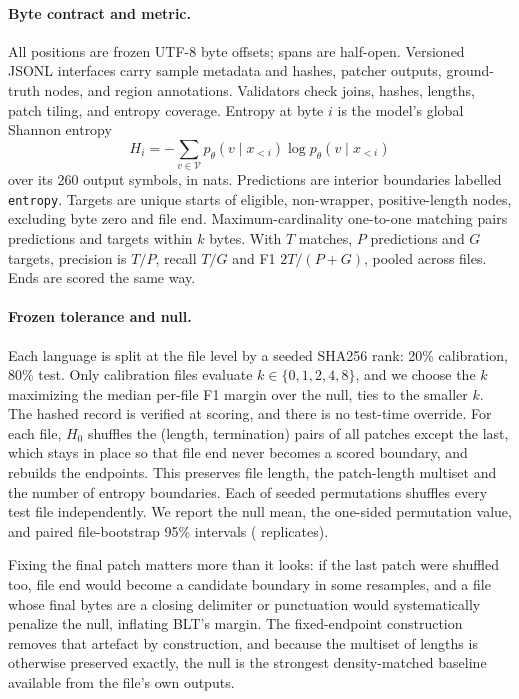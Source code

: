 \paragraph{Byte contract and metric.} All positions are frozen UTF-8 byte offsets; spans are half-open. Versioned JSONL interfaces carry sample metadata and hashes, patcher outputs, ground-truth nodes, and region annotations. Validators check joins, hashes, lengths, patch tiling, and entropy coverage. Entropy at byte $i$ is the model's global Shannon entropy
\begin{equation}
H_i=-\sum_{v\in\mathcal{V}}p_\theta(v\mid x_{<i})\log p_\theta(v\mid x_{<i})
\end{equation}
over its 260 output symbols, in nats. Predictions are interior boundaries labelled \texttt{entropy}. Targets are unique starts of eligible, non-wrapper, positive-length nodes, excluding byte zero and file end. Maximum-cardinality one-to-one matching pairs predictions and targets within $k$ bytes. With $T$ matches, $P$ predictions and $G$ targets, precision is $T/P$, recall $T/G$ and F1 $2T/(P+G)$, pooled across files. Ends are scored the same way.

\paragraph{Frozen tolerance and null.} Each language is split at the file level by a seeded SHA256 rank: 20\% calibration, 80\% test. Only calibration files evaluate $k\in\{0,1,2,4,8\}$, and we choose the $k$ maximizing the median per-file F1 margin over the null, ties to the smaller $k$. The hashed record is verified at scoring, and there is no test-time override. For each file, $H_0$ shuffles the (length, termination) pairs of all patches except the last, which stays in place so that file end never becomes a scored boundary, and rebuilds the endpoints. This preserves file length, the patch-length multiset and the number of entropy boundaries. Each of \nPerm{} seeded permutations shuffles every test file independently. We report the null mean, the one-sided permutation value, and paired file-bootstrap 95\% intervals (\nBoot{} replicates).

Fixing the final patch matters more than it looks: if the last patch were shuffled too, file end would become a candidate boundary in some resamples, and a file whose final bytes are a closing delimiter or punctuation would systematically penalize the null, inflating BLT's margin. The fixed-endpoint construction removes that artefact by construction, and because the multiset of lengths is otherwise preserved exactly, the null is the strongest density-matched baseline available from the file's own outputs.

